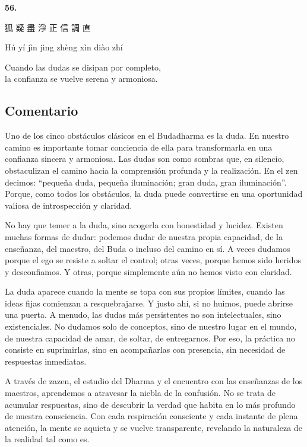 \documentclass[
  a5paperpaper,
]{article}
\begin{document}
\begin{verseblock}

\newpage

\begin{center}\textbf{56.}\end{center}

狐 疑 盡 淨 正 信 調 直

Hú yí jìn jìng zhèng xìn diào zhí

Cuando las dudas se disipan por completo,\\
la confianza se vuelve serena y armoniosa.

\end{verseblock}

\hfill\break

\hypertarget{comentario-55}{%
\subsection{Comentario}\label{comentario-55}}

Uno de los cinco obstáculos clásicos en el Budadharma es la duda. En
nuestro camino es importante tomar conciencia de ella para transformarla
en una confianza sincera y armoniosa. Las dudas son como sombras que, en
silencio, obstaculizan el camino hacia la comprensión profunda y la
realización. En el zen decimos: ``pequeña duda, pequeña iluminación;
gran duda, gran iluminación''. Porque, como todos los obstáculos, la
duda puede convertirse en una oportunidad valiosa de introspección y
claridad.

No hay que temer a la duda, sino acogerla con honestidad y lucidez.
Existen muchas formas de dudar: podemos dudar de nuestra propia
capacidad, de la enseñanza, del maestro, del Buda o incluso del camino
en sí. A veces dudamos porque el ego se resiste a soltar el control;
otras veces, porque hemos sido heridos y desconfiamos. Y otras, porque
simplemente aún no hemos visto con claridad.

La duda aparece cuando la mente se topa con sus propios límites, cuando
las ideas fijas comienzan a resquebrajarse. Y justo ahí, si no huimos,
puede abrirse una puerta. A menudo, las dudas más persistentes no son
intelectuales, sino existenciales. No dudamos solo de conceptos, sino de
nuestro lugar en el mundo, de nuestra capacidad de amar, de soltar, de
entregarnos. Por eso, la práctica no consiste en suprimirlas, sino en
acompañarlas con presencia, sin necesidad de respuestas inmediatas.

A través de zazen, el estudio del Dharma y el encuentro con las
enseñanzas de los maestros, aprendemos a atravesar la niebla de la
confusión. No se trata de acumular respuestas, sino de descubrir la
verdad que habita en lo más profundo de nuestra consciencia. Con cada
respiración consciente y cada instante de plena atención, la mente se
aquieta y se vuelve transparente, revelando la naturaleza de la realidad
tal como es.
\end{document}
